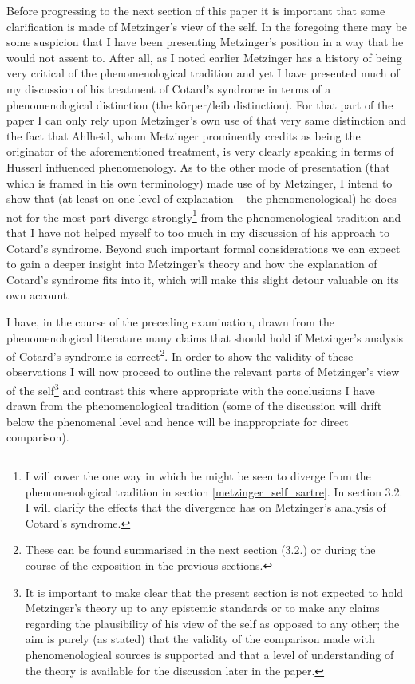 Before progressing to the next section of this paper it is important that some clarification is made of Metzinger's view of the self. In the foregoing there may be some suspicion that I have been presenting Metzinger's position in a way that he would not assent to. After all, as I noted earlier Metzinger has a history of being very critical of the phenomenological tradition and yet I have presented much of my discussion of his treatment of Cotard's syndrome in terms of a phenomenological distinction (the k\"{o}rper/leib distinction). For that part of the paper I can only rely upon Metzinger's own use of that very same distinction and the fact that Ahlheid, whom Metzinger prominently credits as being the originator of the aforementioned treatment, is very clearly speaking in terms of Husserl influenced phenomenology. As to the other mode of presentation (that which is framed in his own terminology) made use of by Metzinger, I intend to show that (at least on one level of explanation – the phenomenological) he does not for the most part diverge strongly\footnote{I will cover the one way in which he might be seen to diverge from the phenomenological tradition in section \ref{metzinger_self_sartre}. In section 3.2. I will clarify the effects that the divergence has on Metzinger's analysis of Cotard's syndrome.} from the phenomenological tradition and that I have not helped myself to too much in my discussion of his approach to Cotard's syndrome. Beyond such important formal considerations we can expect to gain a deeper insight into Metzinger's theory and how the explanation of Cotard's syndrome fits into it, which will make this slight detour valuable on its own account.

I have, in the course of the preceding examination, drawn from the phenomenological literature many claims that should hold if Metzinger's analysis of Cotard's syndrome is correct\footnote{These can be found summarised in the next section (3.2.) or during the course of the exposition in the previous sections.}. In order to show the validity of these observations I will now proceed to outline the relevant parts of Metzinger's view of the self\footnote{It is important to make clear that the present section is not expected to hold Metzinger's theory up to any epistemic standards or to make any claims regarding the plausibility of his view of the self as opposed to any other; the aim is purely (as stated) that the validity of the comparison made with phenomenological sources is supported and that a level of understanding of the theory is available for the discussion later in the paper.} and contrast this where appropriate with the conclusions I have drawn from the phenomenological tradition (some of the discussion will drift below the phenomenal level and hence will be inappropriate for direct comparison).

